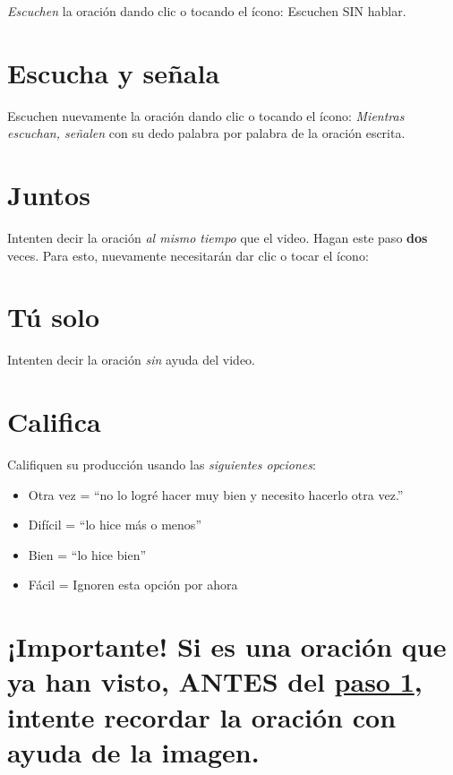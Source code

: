 \documentclass[
]{book}
\begin{document}
\emph{Escuchen} la oración dando clic o tocando el ícono: Escuchen SIN hablar.

\hypertarget{escucha-y-seuxf1ala}{%
\section{Escucha y señala}\label{escucha-y-seuxf1ala}}

Escuchen nuevamente la oración dando clic o tocando el ícono: \emph{Mientras escuchan, señalen} con su dedo palabra por palabra de la oración escrita.

\hypertarget{juntos}{%
\section{Juntos}\label{juntos}}

Intenten decir la oración \emph{al mismo tiempo} que el video. Hagan este paso \textbf{dos} veces. Para esto, nuevamente necesitarán dar clic o tocar el ícono:

\hypertarget{tuxfa-solo}{%
\section{Tú solo}\label{tuxfa-solo}}

Intenten decir la oración \emph{sin} ayuda del video.

\hypertarget{califica}{%
\section{Califica}\label{califica}}

Califiquen su producción usando las \emph{siguientes opciones}:

\begin{itemize}
\item
  Otra vez = ``no lo logré hacer muy bien y necesito hacerlo otra vez.''
\item
  Difícil = ``lo hice más o menos''
\item
  Bien = ``lo hice bien''
\item
  Fácil = Ignoren esta opción por ahora
\end{itemize}

\hypertarget{importante-si-es-una-oraciuxf3n-que-ya-han-visto-antes-del-paso-1-intente-recordar-la-oraciuxf3n-con-ayuda-de-la-imagen.}{%
\section{\texorpdfstring{¡Importante! Si es una oración que \textbf{ya} han visto, ANTES del \protect\hyperlink{cross_2}{paso 1}, intente recordar la oración con ayuda de la imagen.}{¡Importante! Si es una oración que ya han visto, ANTES del paso 1, intente recordar la oración con ayuda de la imagen.}}\label{importante-si-es-una-oraciuxf3n-que-ya-han-visto-antes-del-paso-1-intente-recordar-la-oraciuxf3n-con-ayuda-de-la-imagen.}}
\end{document}
